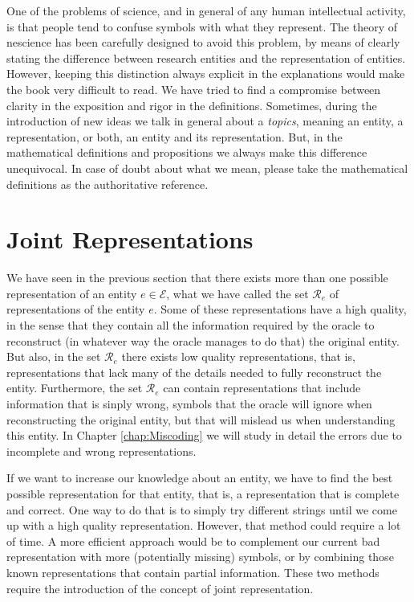 \begin{remark}
One of the problems of science, and in general of any human intellectual activity, is that people tend to confuse symbols with what they represent. The theory of nescience has been carefully designed to avoid this problem, by means of clearly stating the difference between research entities and the representation of entities. However, keeping this distinction always explicit in the explanations would make the book very difficult to read. We have tried to find a compromise between clarity in the exposition and rigor in the definitions. Sometimes, during the introduction of new ideas we talk in general about a \emph{topics}, meaning an entity, a representation, or both, an entity and its representation. But, in the mathematical definitions and propositions we always make this difference unequivocal. In case of doubt about what we mean, please take the mathematical definitions as the authoritative reference. 
\end{remark}

%
%

\section{Joint Representations}
\label{sec:descriptions_joint_topic}

We have seen in the previous section that there exists more than one possible representation of an entity $e \in \mathcal{E}$, what we have called the set $\mathcal{R}_e$ of representations of the entity $e$. Some of these representations have a high quality, in the sense that they contain all the information required by the oracle to reconstruct (in whatever way the oracle manages to do that) the original entity. But also, in the set $\mathcal{R}_e$ there exists low quality representations, that is, representations that lack many of the details needed to fully reconstruct the entity. Furthermore, the set $\mathcal{R}_e$ can contain representations that include information that is sinply wrong, symbols that the oracle will ignore when reconstructing the original entity, but that will mislead us when understanding this entity. In Chapter \ref{chap:Miscoding} we will study in detail the errors due to incomplete and wrong representations.

If we want to increase our knowledge about an entity, we have to find the best possible representation for that entity, that is, a representation that is complete and correct. One way to do that is to simply try different strings until we come up with a high quality representation. However, that method could require a lot of time. A more efficient approach would be to complement our current bad representation with more (potentially missing) symbols, or by combining those known representations that contain partial information. These two methods require the introduction of the concept of joint representation.

